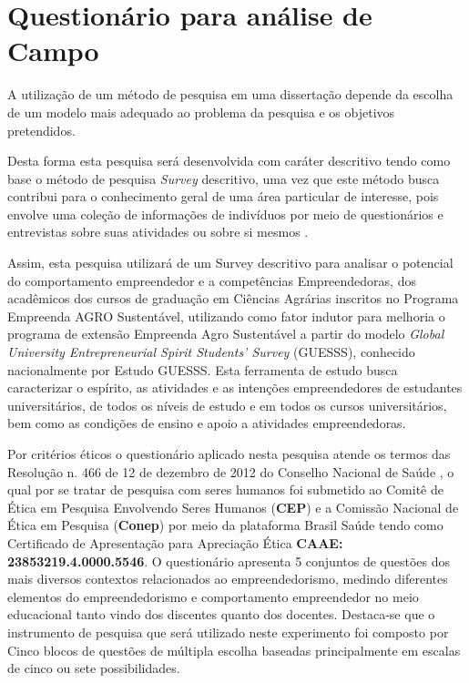 \newpage
\section{Questionário para análise de Campo}

A utilização de um método de pesquisa em uma dissertação depende da escolha de um modelo mais adequado ao problema da pesquisa e os objetivos pretendidos.

Desta forma esta pesquisa será desenvolvida com caráter descritivo tendo como base o método de pesquisa \textit{Survey} descritivo, uma vez que este método busca contribui para o conhecimento geral de uma área particular de interesse, pois envolve uma coleção de informações de indivíduos por meio de questionários e entrevistas sobre suas atividades ou sobre si mesmos \cite{forza_survey_2002}.


Assim, esta pesquisa utilizará de um Survey descritivo para analisar o potencial do comportamento empreendedor e a competências Empreendedoras, dos acadêmicos dos cursos de graduação em Ciências Agrárias inscritos no Programa Empreenda AGRO Sustentável, utilizando como fator indutor para melhoria o programa de extensão Empreenda Agro Sustentável a partir do modelo \textit{Global University Entrepreneurial Spirit Students’ Survey} (GUESSS), conhecido nacionalmente por Estudo GUESSS. Esta ferramenta de estudo busca caracterizar o espírito, as atividades e as intenções empreendedores de estudantes universitários, de todos os níveis de estudo e em todos os cursos universitários, bem como as condições de ensino e apoio a atividades empreendedoras. 



Por critérios éticos o questionário aplicado nesta pesquisa atende os termos das Resolução n. 466 de 12 de dezembro de 2012 do Conselho Nacional de Saúde \cite{cns_resolucao_2012}, o qual por se tratar de pesquisa com seres humanos foi submetido ao Comitê de Ética em Pesquisa Envolvendo Seres Humanos (\textbf{CEP}) e a Comissão Nacional de Ética em Pesquisa (\textbf{Conep}) por meio da plataforma Brasil Saúde tendo como Certificado de Apresentação para Apreciação Ética \textbf{CAAE: 23853219.4.0000.5546}. O questionário apresenta 5 conjuntos de questões dos mais diversos contextos relacionados ao empreendedorismo, medindo diferentes elementos do empreendedorismo e comportamento empreendedor no meio educacional tanto vindo dos discentes quanto dos docentes. Destaca-se que o instrumento de pesquisa que será utilizado neste experimento foi composto por Cinco blocos de questões de múltipla escolha baseadas principalmente em escalas de cinco ou sete possibilidades. 

